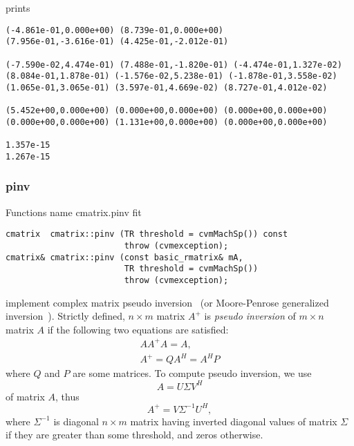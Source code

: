 prints
\begin{Verbatim}
(-4.861e-01,0.000e+00) (8.739e-01,0.000e+00)
(7.956e-01,-3.616e-01) (4.425e-01,-2.012e-01)

(-7.590e-02,4.474e-01) (7.488e-01,-1.820e-01) (-4.474e-01,1.327e-02)
(8.084e-01,1.878e-01) (-1.576e-02,5.238e-01) (-1.878e-01,3.558e-02)
(1.065e-01,3.065e-01) (3.597e-01,4.669e-02) (8.727e-01,4.012e-02)

(5.452e+00,0.000e+00) (0.000e+00,0.000e+00) (0.000e+00,0.000e+00)
(0.000e+00,0.000e+00) (1.131e+00,0.000e+00) (0.000e+00,0.000e+00)

1.357e-15
1.267e-15
\end{Verbatim}
\newpage






\subsubsection{pinv}
Functions%
\pdfdest name {cmatrix.pinv} fit
\begin{verbatim}
cmatrix  cmatrix::pinv (TR threshold = cvmMachSp()) const 
                        throw (cvmexception);
cmatrix& cmatrix::pinv (const basic_rmatrix& mA, 
                        TR threshold = cvmMachSp()) 
                        throw (cvmexception);
\end{verbatim}
implement complex matrix pseudo inversion~
(or Moore-Penrose generalized inversion~).
Strictly defined,  $n\times m$ matrix $A^{+}$ is 
\textit{pseudo inversion} of $m\times n$ matrix $A$ if the following two equations
are satisfied:
\begin{gather*}
AA^{+}A=A,\\
A^{+}=QA^H=A^HP
\end{gather*}
where $Q$ and $P$ are some matrices. To compute  pseudo inversion, we use
\begin{equation*}
A = U\Sigma V^H
\end{equation*}
of matrix $A$, thus
\begin{equation*}
A^{+} = V\Sigma^{-1}U^{H},
\end{equation*}
where $\Sigma^{-1}$ is  diagonal $n\times m$ matrix having inverted
diagonal values of  matrix $\Sigma$ if they are greater than some threshold,
and zeros otherwise.

